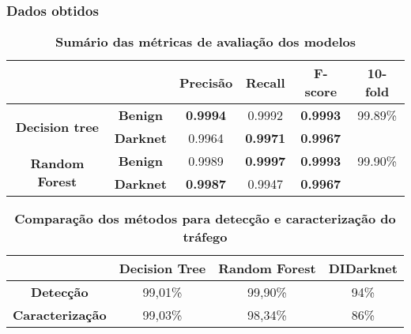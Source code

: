 \begin{frame}
    \frametitle{Dados obtidos}

    \begin{table}[ht]
      \centering
      \caption{\textbf{Sumário das métricas de avaliação dos modelos}}
      \begin{tabular}{|c|c|c|c|c|c|}
        \hline 
         & & \textbf{Precisão} & \textbf{Recall} & \textbf{F-score} & \textbf{10-fold} \\
        \hline
        \multirow{2}{*}{\textbf{Decision tree}} 
            & \textbf{Benign} & \textbf{0.9994} & 0.9992 & \textbf{0.9993} & 99.89\% \\\cline{2-5}
            & \textbf{Darknet} & 0.9964 & \textbf{0.9971} & \textbf{0.9967} &  \\\hline
        \multirow{2}{*}{\textbf{Random Forest}} 
            & \textbf{Benign} & 0.9989 & \textbf{0.9997} & \textbf{0.9993} & 99.90\% \\\cline{2-5}
            & \textbf{Darknet} & \textbf{0.9987} & 0.9947 & \textbf{0.9967} &  \\\hline
      \end{tabular}
    \end{table}

\end{frame}

\begin{frame}
  \begin{table}[ht]
    \centering
    \caption{\textbf{Comparação dos métodos para detecção e caracterização do tráfego}}
    \begin{tabular}{|c|c|c|c|}
      \hline 
       & \textbf{Decision Tree} & \textbf{Random Forest} & \textbf{DIDarknet} \\
      \hline 
      \textbf{Detecção} & 99,01\% & 99,90\% & 94\% \\ 
      \hline 
      \textbf{Caracterização} & 99,03\% & 98,34\% & 86\% \\
      \hline  
    \end{tabular}
  \end{table}
\end{frame}